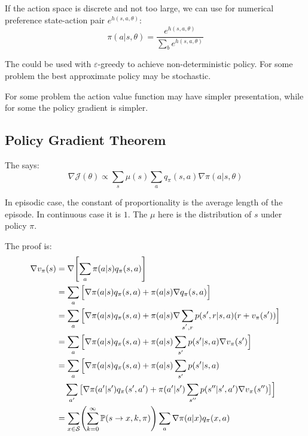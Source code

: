 If the action space is discrete and not too large, we can use  for numerical preference state-action pair $e^{h(s,a,\theta)}$:
\begin{equation}
	\pi(a|s, \theta) = \frac{e^{h(s,a,\theta)}}{\sum_b e^{h(s,a,\theta)}}
\end{equation}

The  could be used with $\varepsilon$-greedy to achieve non-deterministic policy. For some problem the best approximate policy may be stochastic.

For some problem the action value function may have simpler presentation, while for some the policy gradient is simpler.

\subsection{Policy Gradient Theorem}

The  says:
\begin{equation}
	\nabla \mathcal{J}(\theta ) \propto \sum_s \mu(s) \sum_a q_\pi (s,a) \nabla \pi(a|s, \theta )
\end{equation}

In episodic case, the constant of proportionality is the average length of the episode. In continuous case it is $1$. The $\mu$ here is the distribution of $s$ under policy $\pi$.

The proof is:
\begin{equation}
	\begin{aligned}
		\nabla v_\pi(s) &= \nabla \mleft[\sum_a \pi(a|s) q_\pi(s,a) \mright] \\
		&= \sum_a \Big[ \nabla \pi(a|s) q_\pi(s,a) + \pi(a|s) \nabla q_\pi(s,a) \Big] \\
		&= \sum_a \Big[ \nabla \pi(a|s) q_\pi(s,a) + \pi(a|s) \nabla \sum_{s^{'},r} p(s',r|s,a) (r + v_\pi(s'))\Big] \\
		&= \sum_a \Big[ \nabla \pi(a|s) q_\pi(s,a) + \pi(a|s)\sum_{s'} p(s'|s,a) \nabla v_\pi(s') \Big] \\
		&= \sum_a \Big[  \nabla \pi(a|s) q_\pi(s,a) + \pi(a|s) \sum_{s'} p(s'|s,a) \\
		& \ \ \ \sum_{a'}\big[ \nabla \pi(a'|s')q_\pi(s',a') + \pi(a'|s') \sum_{s''} p(s''|s',a') \nabla v_\pi(s'') \big] \Big] \\
		&= \sum_{x \in \mathcal{S}} \mleft( \sum_{k=0}^\infty \mathbb{P}(s \rightarrow x, k, \pi ) \mright) \sum_a \nabla \pi(a|x) q_\pi(x,a)
	\end{aligned}
\end{equation}

